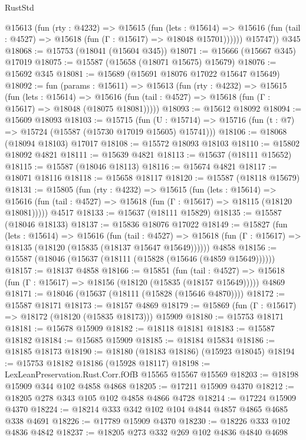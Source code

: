 \begin{lexlean}{RustStd}
\begin{coremodule}
          @15613
            (fun (rty : @4232) =>
            @15615
              (fun (lets : @15614) =>
              @15616 (fun (tail : @4527) => @15618 (fun (Γ : @15617) => @18048 @15701))))))
        @15747))
    @345
@18068 := @15753 (@18041 (@15604 @345))
@18071 := @15666 (@15667 @345) @17019
@18075 := @15587 (@15658 (@18071 @15675) @15679)
@18076 := @15692 @345
@18081 := @15689 (@15691 @18076 @17022 @15647 @15649)
@18092 := fun (params : @15611) =>
  @15613
    (fun (rty : @4232) =>
    @15615
      (fun (lets : @15614) =>
      @15616 (fun (tail : @4527) => @15618 (fun (Γ : @15617) => @18048 (@18075 @18081)))))
@18093 := @15612 @18092
@18094 := @15609 @18093
@18103 := @15715
    (fun (U : @15714) => @15716 (fun (t : @7) => @15724 (@15587 (@15730 @17019 @15605) @15741)))
@18106 := @18068 (@18094 @18103) @17017
@18108 := @15572 @18093 @18103
@18110 := @15802 @18092 @4821
@18111 := @15639 @4821
@18113 := @15637 (@18111 @15652)
@18115 := @15587 (@18046 @18113)
@18116 := @15674 @4821
@18117 := @18071 @18116
@18118 := @15658 @18117
@18120 := @15587 (@18118 @15679)
@18131 := @15805
    (fun (rty : @4232) =>
    @15615
      (fun (lets : @15614) =>
      @15616 (fun (tail : @4527) => @15618 (fun (Γ : @15617) => @18115 (@18120 @18081)))))
    @4517
@18133 := @15637 (@18111 @15829)
@18135 := @15587 (@18046 @18133)
@18137 := @15836 @18076 @17022
@18149 := @15827
    (fun (lets : @15614) =>
    @15616
      (fun (tail : @4527) =>
      @15618 (fun (Γ : @15617) => @18135 (@18120 (@15835 (@18137 @15647 @15649))))))
    @4858
@18156 := @15587 (@18046 (@15637 (@18111 (@15828 (@15646 (@4859 @15649))))))
@18157 := @18137 @4858
@18166 := @15851
    (fun (tail : @4527) => @15618 (fun (Γ : @15617) => @18156 (@18120 (@15835 (@18157 @15649)))))
    @4869
@18171 := @18046 (@15637 (@18111 (@15828 (@15646 @4870))))
@18172 := @15587 @18171
@18173 := @18157 @4869
@18179 := @15869 (fun (Γ : @15617) => @18172 (@18120 (@15835 @18173))) @15909
@18180 := @15753 @18171
@18181 := @15678 @15909
@18182 := @18118 @18181
@18183 := @15587 @18182
@18184 := @15685 @15909
@18185 := @18184 @15834
@18186 := @18185 @18173
@18190 := @18180 (@18183 @18186) (@15923 @18045)
@18194 := @15753 @18182 @18186 (@15928 @18117)
@18198 := LexLeanPreservation.Rust.Corr.fOfB @15565 @15567 @15569
@18203 := @18198 @15909 @344 @102 @4858 @4868
@18205 := @17211 @15909 @4370
@18212 := @18205 @278 @343 @105 @102 @4858 @4866 @4728
@18214 := @17224 @15909 @4370
@18224 := @18214 @333 @342 @102 @104 @4844 @4857 @4865 @4685 @338 @4691
@18226 := @17789 @15909 @4370
@18230 := @18226 @333 @102 @4836 @4842
@18237 := @18205 @273 @332 @269 @102 @4836 @4840 @4698

\end{coremodule}
\end{lexlean}
